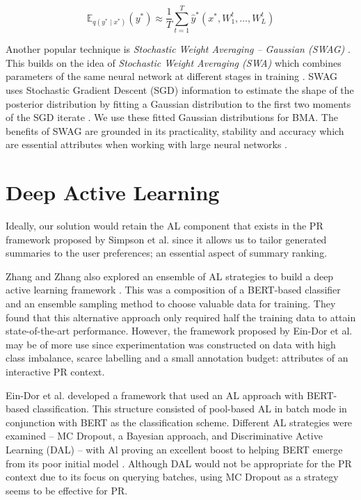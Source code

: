 \documentclass[ %
                    author={James Stephenson},
                supervisor={Dr. Edwin Simpson},
                    degree={MSc},
                     title={PROJECT PLAN},
                  subtitle={Bayesian Deep Learning For Extractive Test Summarisation},
                      type={},
                      year={2022}]{../additions/dissertation}
\begin{document}
			$$
				\mathbb{E}_{q(y^\ast \mid x^\ast)}(y^\ast) \approx \frac{1}{T} \sum_{t=1}^{T} \hat{y}^\ast(x^\ast, W_{1}^{t}, \ldots, W_{L}^{t})
			$$
			
			Another popular technique is \emph{Stochastic Weight Averaging – Gaussian (SWAG)} \cite{Maddox19}. This builds on the idea of \emph{Stochastic Weight Averaging (SWA)} which combines parameters of the same neural network at different stages in training \cite{Dmitrii18}. SWAG uses Stochastic Gradient Descent (SGD) information to estimate the shape of the posterior distribution by fitting a Gaussian distribution to the first two moments of the SGD iterate \cite{Maddox19}. We use these fitted Gaussian distributions for BMA. The benefits of SWAG are grounded in its practicality, stability and accuracy which are essential attributes when working with large neural networks \cite{Maddox19}.

			
		\section{Deep Active Learning}
		\label{chap:literaturereview:deepactive}
		
		Ideally, our solution would retain the AL component that exists in the PR framework proposed by Simpson et al. \cite{Simpson19} since it allows us to tailor generated summaries to the user preferences; an essential aspect of summary ranking.
		
		\medbreak
		Zhang and Zhang also explored an ensemble of AL strategies to build a deep active learning framework \cite{Zhang19}. This was a composition of a BERT-based classifier and an ensemble sampling method to choose valuable data for training. They found that this alternative approach only required half the training data to attain state-of-the-art performance. However, the framework proposed by Ein-Dor et al. \cite{EinDor20} may be of more use since experimentation was constructed on data with high class imbalance, scarce labelling and a small annotation budget: attributes of an interactive PR context.  
		
		\medbreak
		Ein-Dor et al. \cite{EinDor20} developed a framework that used an AL approach with BERT-based classification. This structure consisted of pool-based AL in batch mode in conjunction with BERT as the classification scheme. Different AL strategies were examined – MC Dropout, a Bayesian approach, and Discriminative Active Learning (DAL) \cite{Gissin19} – with Al proving an excellent boost to helping BERT emerge from its poor initial model \cite{EinDor20}. Although DAL would not be appropriate for the PR context due to its focus on querying batches, using MC Dropout as a strategy seems to be effective for PR.
		
\end{document}
